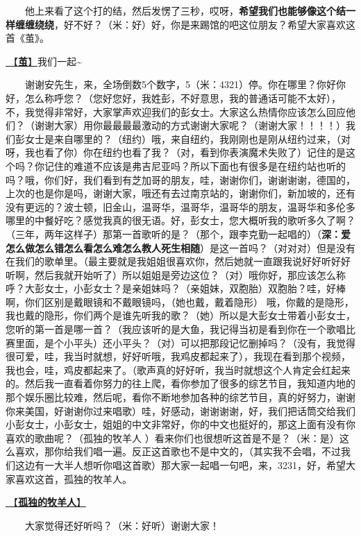 \documentclass[]{ctexbook}
\begin{document}
  他上来看了这个打的结，然后发愣了三秒，哎呀，\textbf{希望我们也能够像这个结一样缠缠绕绕}，好不好？（米：好）好，你是来踢馆的吧这位朋友？希望大家喜欢这首《茧》。

\hyperref[]{🎵【\textbf{茧}】}我们一起\textasciitilde{}

  谢谢安先生，来，全场倒数5个数字，5（米：4321）停。你在哪里？你好你好，怎么称呼您？（您好您好，我姓彭，不好意思，我的普通话可能不太好），不，我觉得非常好，大家掌声欢迎我们的彭女士。大家这么热情你应该怎么回应他们？（谢谢大家）用你最最最最激动的方式谢谢大家呢？（谢谢大家！！！！）我们彭女士是来自哪里的？（纽约）哦，来自纽约，我刚刚也是刚从纽约过来，（对呀，我也看了你）你在纽约也看了我？（对，看到你表演魔术失败了）记住的是这个吗？你记住的难道不应该是弗吉尼亚吗？所以下面也有很多是在纽约站也听的吗？哦，你们好，我们看到有芝加哥的朋友，哇，谢谢你们，谢谢谢谢，德国的，上次的也是你是吗，谢谢大家，哦还有去过南京站的，谢谢你们，新加坡的，还有没有更远的？波士顿，旧金山，温哥华，温哥华，温哥华的朋友，温哥华和多伦多哪里的中餐好吃？感觉我真的很无语。好，彭女士，您大概听我的歌听多久了啊？（三年，两年这样子）那第一首歌听的是？（那个，跟李克勤一起唱的）（\textbf{深：爱怎么做怎么错怎么看怎么难怎么教人死生相随}）是这一首吗？（对对对）但是没有在我们的歌单里。（最主要就是我姐姐很喜欢你，然后她就一直跟我说好好听好好听啊，然后我就开始听了）所以姐姐是旁边这位？（对）哦你好，那应该怎么称呼？大彭女士，小彭女士？是亲姐妹吗？（亲姐妹，双胞胎）双胞胎？哇，好棒啊，你们区别是戴眼镜和不戴眼镜吗，（她也戴，戴着隐形） 哦，你戴的是隐形，我也戴的隐形，你们两个是谁先听我的歌？（她）所以是大彭女士带着小彭女士，您听的第一首是哪一首？（我应该听的是大鱼，我记得当初是看到你在一个歌唱比赛里面，是个小平头）还小平头？（对）可以把那段记忆删掉吗？（没有，我觉得很可爱，哇，我当时就想，好好听哦，我鸡皮都起来了），我现在看到那个视频，我也会，哇，鸡皮都起来了。（歌声真的好好听，我当时就想这个人肯定会红起来的。然后我一直看着你努力的往上爬，看你参加了很多的综艺节目，我知道内地的那个娱乐圈比较难，然后呢，看你不断地参加各种的综艺节目，真的好努力，谢谢你来美国，好谢谢你过来唱歌）哇，好感动，谢谢谢谢，好，我们把话筒交给我们小彭女士，小彭女士，姐姐的中文非常好，你的中文也挺好的，那这上面有没有你喜欢的歌曲呢？（孤独的牧羊人 ）看来你们也很想听这首是不是？（米：是）这么喜欢，那你给我们唱一遍。反正这首歌也不是中文的，（其实我不会唱，不过我们这边有一大半人想听你唱这首歌）那大家一起唱一句吧，来，3231，好，希望大家喜欢这首，孤独的牧羊人。

\hyperref[lonely-shepherd]{🎵【\textbf{孤独的牧羊人}】}

  大家觉得还好听吗？（米：好听）谢谢大家！
\end{document}

